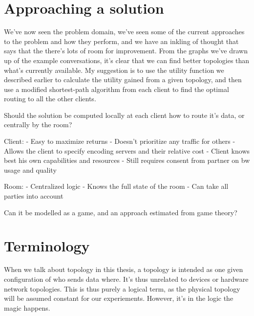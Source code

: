 \section{Approaching a solution}

We've now seen the problem domain, we've seen some of the current approaches to the problem and how they perform, and we have an inkling of thought that says that the there's lots of room for improvement. From the graphs we've drawn up of the example conversations, it's clear that we can find better topologies than what's currently available. My suggestion is to use the utility function we described earlier to calculate the utility gained from a given topology, and then use a modified shortest-path algorithm from each client to find the optimal routing to all the other clients.

Should the solution be computed locally at each client how to route it's data, or centrally by the room?

    Client:
        - Easy to maximize returns
        - Doesn't prioritize any traffic for others
        - Allows the client to specify encoding servers and their relative cost
        - Client knows best his own capabilities and resources
        - Still requires consent from partner on bw usage and quality

    Room:
        - Centralized logic
        - Knows the full state of the room
        - Can take all parties into account

Can it be modelled as a game, and an approach estimated from game theory?

\section{Terminology}

When we talk about topology in this thesis, a topology is intended as one given configuration of who sends data where. It's thus unrelated to devices or hardware network topologies.  This is thus purely a logical term, as the physical topology will be assumed constant for our experiements. However, it's in the logic the magic happens.

